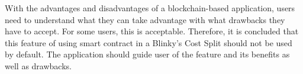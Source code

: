 \documentclass[twoside,numperchapter]{tutthesis} %
\newif\ifnameyear
\begin{document}
With the advantages and disadvantages of a blockchain-based application, users need to understand what they can take advantage with what drawbacks they have to accept. For some users, this is acceptable. Therefore, it is concluded that this feature of using smart contract in a Blinky's Cost Split should not be used by default. The application should guide user of the feature and its benefits as well as drawbacks.




\ifnameyear
  
\else
  
\fi

\end{document}
